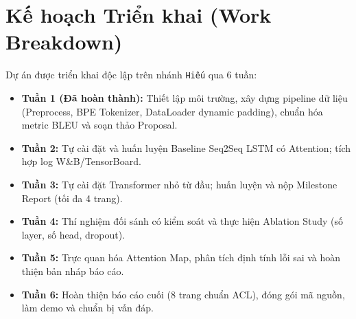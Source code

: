 \documentclass[11pt]{article}
\begin{document}
\section{Kế hoạch Triển khai (Work Breakdown)}
Dự án được triển khai độc lập trên nhánh \texttt{Hiếu} qua 6 tuần:
\begin{itemize}
    \item \textbf{Tuần 1 (Đã hoàn thành):} Thiết lập môi trường, xây dựng pipeline dữ liệu (Preprocess, BPE Tokenizer, DataLoader dynamic padding), chuẩn hóa metric BLEU và soạn thảo Proposal.
    \item \textbf{Tuần 2:} Tự cài đặt và huấn luyện Baseline Seq2Seq LSTM có Attention; tích hợp log W\&B/TensorBoard.
    \item \textbf{Tuần 3:} Tự cài đặt Transformer nhỏ từ đầu; huấn luyện và nộp Milestone Report (tối đa 4 trang).
    \item \textbf{Tuần 4:} Thí nghiệm đối sánh có kiểm soát và thực hiện Ablation Study (số layer, số head, dropout).
    \item \textbf{Tuần 5:} Trực quan hóa Attention Map, phân tích định tính lỗi sai và hoàn thiện bản nháp báo cáo.
    \item \textbf{Tuần 6:} Hoàn thiện báo cáo cuối (8 trang chuẩn ACL), đóng gói mã nguồn, làm demo và chuẩn bị vấn đáp.
\end{itemize}


\end{document}
